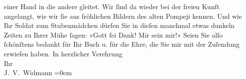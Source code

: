 \begin{ledgroupsized}[t]{13cm}
                    einer Hand in die andere gleitet. Wir ſind da wieder bei der freien Kunſt
                    angelangt, wie wir ſie aus fröhlichen Bildern des alten Pompeji kennen. Und wie Ihr Soldat zum Stubenmädchen dürfen Sie in dieſen
                    manchmal {\pb}etwas dunkeln Zeiten zu Ihrer Mühe
                    ſagen: »Gott ſei Dank! Mir sein mir!«\pend
           \pstart
           Seien Sie alſo ſchönſtens bedankt für Ihr Buch u. für die Ehre, die Sie mir mit der Zuſendung
                    erwieſen haben.\pend
           \pstart
           In herzlicher Verehrung{\\[\baselineskip]}Ihr{\\[\baselineskip]}\spacefill\mbox{J. V. Widmann}\pend
           \leftskip=0em{}
         
         \endnumbering{}\end{ledgroupsized}  \newcommand{\dateiname}{L01044}\newcommand{\titel}{Joseph Victor Widmann an Arthur Schnitzler, 28. 5. 1900}\newcommand{\editorInnen}{Martin Anton Müller und Gerd-Hermann Susen}
      